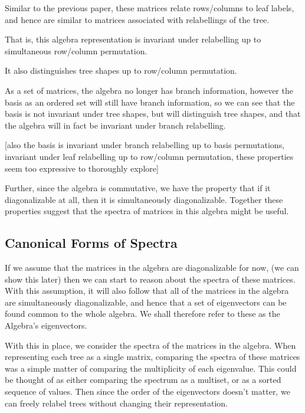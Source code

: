 \documentclass{report}
\begin{document}

Similar to the previous paper, these matrices relate rows/columns to leaf
labels, and hence are similar to matrices associated with relabellings of the
tree.

That is, this algebra representation is invariant under relabelling up to simultaneous row/column permutation.

It also distinguishes tree shapes up to row/column permutation.

As a set of matrices, the algebra no longer has branch information, however the basis as an ordered set will still have branch information, so we can see that the basis is not invariant under tree shapes, but will distinguish tree shapes, and that the algebra will in fact be invariant under branch relabelling.

[also the basis is invariant under branch relabelling up to basis permutations, invariant under leaf relabelling up to row/column permutation, these properties seem too expressive to thoroughly explore]

Further, since the algebra is commutative, we have the property that if it
diagonalizable at all, then it is simultaneously diagonalizable.
Together these properties suggest that the spectra of matrices in this algebra
might be useful.

\subsection{Canonical Forms of Spectra}

If we assume that the matrices in the algebra are diagonalizable for now, (we
can show this later) then we can start to reason about the spectra of these
matrices.
With this assumption, it will also follow that all of the matrices in the
algebra are simultaneously diagonalizable, and hence that a set of eigenvectors
can be found common to the whole algebra.
We shall therefore refer to these as the Algebra's eigenvectors.

With this in place, we consider the spectra of the matrices in the algebra.
When representing each tree as a single matrix, comparing the spectra of these
matrices was a simple matter of comparing the multiplicity of each eigenvalue.
This could be thought of as either comparing the spectrum as a multiset, or as
a sorted sequence of values.
Then since the order of the eigenvectors doesn't matter, we can freely relabel
trees without changing their representation.
\end{document}
